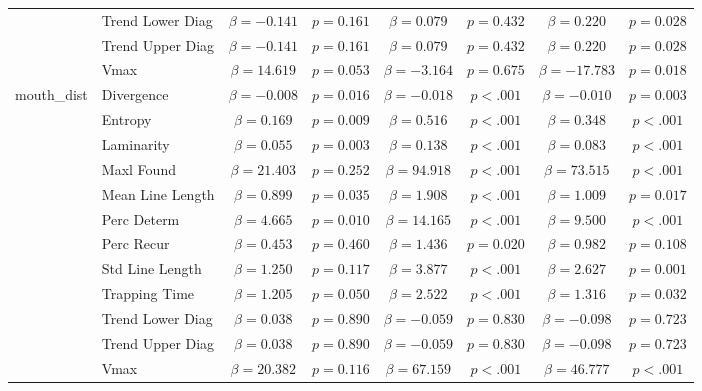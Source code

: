 \begin{tabular}{llcc|cc|cc}
 & Trend Lower Diag & $\beta = -0.141$ & $p = 0.161$ & $\beta = 0.079$ & $p = 0.432$ & $\beta = 0.220$ & $p = 0.028$ \\
 & Trend Upper Diag & $\beta = -0.141$ & $p = 0.161$ & $\beta = 0.079$ & $p = 0.432$ & $\beta = 0.220$ & $p = 0.028$ \\
 & Vmax & $\beta = 14.619$ & $p = 0.053$ & $\beta = -3.164$ & $p = 0.675$ & $\beta = -17.783$ & $p = 0.018$ \\
\midrule
\multirow{12}{*}{mouth_dist} & Divergence & $\beta = -0.008$ & $p = 0.016$ & $\beta = -0.018$ & $p < .001$ & $\beta = -0.010$ & $p = 0.003$ \\
 & Entropy & $\beta = 0.169$ & $p = 0.009$ & $\beta = 0.516$ & $p < .001$ & $\beta = 0.348$ & $p < .001$ \\
 & Laminarity & $\beta = 0.055$ & $p = 0.003$ & $\beta = 0.138$ & $p < .001$ & $\beta = 0.083$ & $p < .001$ \\
 & Maxl Found & $\beta = 21.403$ & $p = 0.252$ & $\beta = 94.918$ & $p < .001$ & $\beta = 73.515$ & $p < .001$ \\
 & Mean Line Length & $\beta = 0.899$ & $p = 0.035$ & $\beta = 1.908$ & $p < .001$ & $\beta = 1.009$ & $p = 0.017$ \\
 & Perc Determ & $\beta = 4.665$ & $p = 0.010$ & $\beta = 14.165$ & $p < .001$ & $\beta = 9.500$ & $p < .001$ \\
 & Perc Recur & $\beta = 0.453$ & $p = 0.460$ & $\beta = 1.436$ & $p = 0.020$ & $\beta = 0.982$ & $p = 0.108$ \\
 & Std Line Length & $\beta = 1.250$ & $p = 0.117$ & $\beta = 3.877$ & $p < .001$ & $\beta = 2.627$ & $p = 0.001$ \\
 & Trapping Time & $\beta = 1.205$ & $p = 0.050$ & $\beta = 2.522$ & $p < .001$ & $\beta = 1.316$ & $p = 0.032$ \\
 & Trend Lower Diag & $\beta = 0.038$ & $p = 0.890$ & $\beta = -0.059$ & $p = 0.830$ & $\beta = -0.098$ & $p = 0.723$ \\
 & Trend Upper Diag & $\beta = 0.038$ & $p = 0.890$ & $\beta = -0.059$ & $p = 0.830$ & $\beta = -0.098$ & $p = 0.723$ \\
 & Vmax & $\beta = 20.382$ & $p = 0.116$ & $\beta = 67.159$ & $p < .001$ & $\beta = 46.777$ & $p < .001$ \\
\midrule
\bottomrule
\end{tabular}